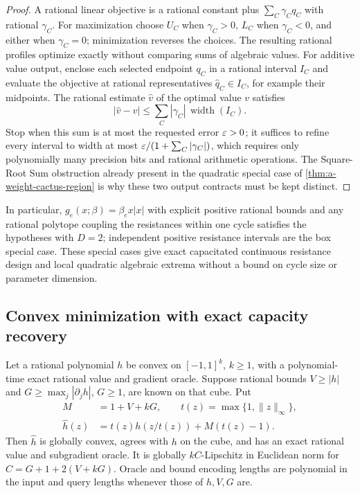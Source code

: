 \begin{proof}
A rational linear objective is a rational constant plus
$\sum_C\gamma_Cq_C$ with rational $\gamma_C$.  For maximization choose
$U_C$ when $\gamma_C>0$, $L_C$ when $\gamma_C<0$, and either when
$\gamma_C=0$; minimization reverses the choices.  The resulting rational
profiles optimize exactly without comparing sums of algebraic values.
For additive value output, enclose each selected endpoint $q_C$ in a
rational interval $I_C$ and evaluate the objective at rational
representatives $\widehat q_C\in I_C$, for example their midpoints.
The rational estimate $\widehat v$ of the optimal value $v$ satisfies
\[
 |\widehat v-v|\le\sum_C|\gamma_C|\,
       \operatorname{width}(I_C).
\]
Stop when this sum is at most the requested error $\varepsilon>0$; it
suffices to refine every interval to width at most
$\varepsilon/(1+\sum_C|\gamma_C|)$, which requires only polynomially many
precision bits and rational arithmetic operations.
The Square-Root Sum obstruction already present in the quadratic
special case of \cref{thm:a-weight-cactus-region} is why these two
output contracts must be kept distinct.
\end{proof}

In particular, $g_e(x;\beta)=\beta_e x|x|$ with explicit positive
rational bounds and any rational polytope coupling the resistances
within one cycle satisfies the hypotheses with $D=2$; independent
positive resistance intervals are the box special case.  These special
cases give exact capacitated continuous resistance design and local
quadratic algebraic extrema without a bound on cycle size or parameter
dimension.

\subsection{Convex minimization with exact capacity recovery}

\begin{lemma}
\label{lem:a-design-perspective}
Let a rational polynomial $h$ be convex on $[-1,1]^k$, $k\ge1$,
with a polynomial-time exact rational value and gradient oracle.
Suppose rational bounds $V\ge|h|$ and
$G\ge\max_j|\partial_jh|$, $G\ge1$, are known on that cube.
Put
\begin{align*}
 M&=1+V+kG,\qquad t(z)=\max\{1,\|z\|_\infty\},\\
 \widehat h(z)&=t(z)h(z/t(z))+M(t(z)-1).
\end{align*}
Then $\widehat h$ is globally convex, agrees with $h$ on the cube,
and has an exact rational value and subgradient oracle.  It is
globally $kC$-Lipschitz in Euclidean norm for
$C=G+1+2(V+kG)$.  Oracle and bound encoding lengths are polynomial in
the input and query lengths whenever those of $h,V,G$ are.
\end{lemma}


